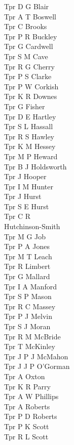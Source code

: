 \begin{multicols}{3}
  Tpr D G Blair \\
  Tpr A T Boswell \\
  Tpr C Brooks \\
  Tpr P R Buckley \\
  Tpr G Cardwell \\
  Tpr S M Cave \\
  Tpr R G Cherry \\
  Tpr P S Clarke \\
  Tpr P W Corkish \\
  Tpr K R Downes \\
  Tpr G Fisher \\
  Tpr D E Hartley \\
  Tpr S L Hassall \\
  Tpr R S Hawley \\
  Tpr K M Hessey \\
  Tpr M P Heward \\
  Tpr B J Holdsworth \\
  Tpr J Hooper \\
  Tpr I M Hunter \\
  Tpr J Hurst \\
  Tpr S E Hurst \\
  Tpr C R \\ \indent Hutchinson-Smith \\
  Tpr M G Job \\
  Tpr P A Jones \\
  Tpr M T Leach \\
  Tpr R Limbert \\
  Tpr G Mallard \\
  Tpr I A Manford \\
  Tpr S P Mason \\
  Tpr R C Massey \\
  Tpr P J Melvin \\
  Tpr S J Moran \\
  Tpr R M McBride \\
  Tpr T McKinley \\
  Tpr J P J McMahon \\
  Tpr J J P O'Gorman \\
  Tpr A Oxton \\
  Tpr K R Parry \\
  Tpr A W Phillips \\
  Tpr A Roberts \\
  Tpr P D Roberts \\
  Tpr P K Scott \\
  Tpr R L Scott \\

\end{multicols}
